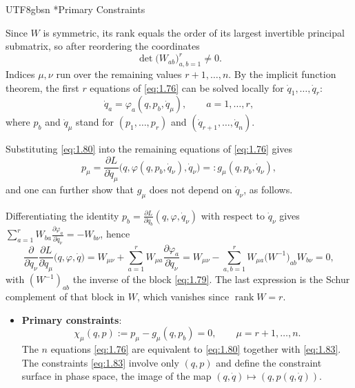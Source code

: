 \documentclass[11pt,a4paper,oneside]{report}
\makeatletter
\newcommand\topic{\@startsection{paragraph}{4}{\z@}{-1.7ex plus -.3ex}{.5ex}{\normalfont\normalsize\bfseries\itshape\boldmath}*}
\makeatother
\begin{document}
\begin{CJK*}{UTF8}{gbsn}
\topic{Primary Constraints}

Since $W$ is symmetric, its rank equals the order of its largest invertible principal submatrix, so after reordering the coordinates
\begin{equation*}
\det\bigl(W_{ab}\bigr)_{a,b=1}^{r}\neq0.
\tag{1.79}\label{eq:1.79}
\end{equation*}
Indices $\mu,\nu$ run over the remaining values $r+1,\ldots,n$. By the implicit function theorem, the first $r$ equations of \eqref{eq:1.76} can be solved locally for $\dot q_1,\ldots,\dot q_r$:
\begin{equation*}
\dot q_a=\varphi_a(q,p_b,\dot q_\mu),\qquad a=1,\ldots,r,
\tag{1.80}\label{eq:1.80}
\end{equation*}
where $p_b$ and $\dot q_\mu$ stand for $(p_1,\ldots,p_r)$ and $(\dot q_{r+1},\ldots,\dot q_n)$.

Substituting \eqref{eq:1.80} into the remaining equations of \eqref{eq:1.76} gives
\begin{equation*}
p_\mu=\frac{\partial L}{\partial\dot q_\mu}\bigl(q,\varphi(q,p_b,\dot q_\nu),\dot q_\nu\bigr)=:g_\mu(q,p_b,\dot q_\nu),
\tag{1.81}\label{eq:1.81}
\end{equation*}
and one can further show that $g_\mu$ does not depend on $\dot q_\nu$, as follows.

Differentiating the identity $p_b=\frac{\partial L}{\partial\dot q_b}(q,\varphi,\dot q_\nu)$ with respect to $\dot q_\nu$ gives $\sum_{a=1}^rW_{ba}\frac{\partial\varphi_a}{\partial\dot q_\nu}=-W_{b\nu}$, hence
\begin{equation*}
\frac{\partial}{\partial\dot q_\nu}\frac{\partial L}{\partial\dot q_\mu}\bigl(q,\varphi,\dot q\bigr)
=W_{\mu\nu}+\sum_{a=1}^rW_{\mu a}\frac{\partial\varphi_a}{\partial\dot q_\nu}
=W_{\mu\nu}-\sum_{a,b=1}^rW_{\mu a}\bigl(W^{-1}\bigr)_{ab}W_{b\nu}=0,
\tag{1.82}\label{eq:1.82}
\end{equation*}
with $(W^{-1})_{ab}$ the inverse of the block \eqref{eq:1.79}. The last expression is the Schur complement of that block in $W$, which vanishes since $\operatorname{rank}W=r$.
\begin{itemize}


\item \textbf{\boldmath Primary constraints}:
\begin{equation*}
{\displaystyle \chi_\mu(q,p):=p_\mu-g_\mu(q,p_b)=0,\qquad\mu=r+1,\ldots,n.}
\tag{1.83}\label{eq:1.83}
\end{equation*}
The $n$ equations \eqref{eq:1.76} are equivalent to \eqref{eq:1.80} together with \eqref{eq:1.83}. The constraints \eqref{eq:1.83} involve only $(q,p)$ and define the constraint surface in phase space, the image of the map $(q,\dot q)\mapsto(q,p(q,\dot q))$.


\end{itemize}
\end{CJK*}
\end{document}
